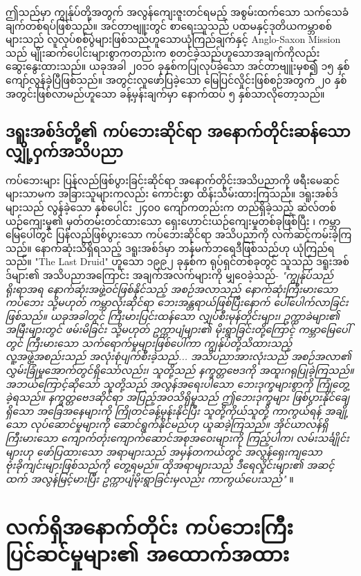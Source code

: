 \documentclass[10pt,twocolumn,letterpaper]{article}
\begin{document}
ဤသည်မှာ ကျွန်ုပ်တို့အတွက် အလွန်ကျေးဇူးတင်ရမည့် အစွမ်းထက်သော သက်သေခံချက်တစ်ရပ်ဖြစ်သည်။ အင်တာဗျူးတွင် စာရေးသူသည် ပထမနှင့်ဒုတိယကမ္ဘာစစ်များသည် လူလုပ်စစ်ပွဲများဖြစ်သည်ဟူသောယုံကြည်ချက်နှင့် Anglo-Saxon Mission သည် မျိုးဆက်ပေါင်းများစွာကတည်းက စတင်ခဲ့သည်ဟူသောအချက်ကိုလည်း ဆွေးနွေးထားသည်။ ယခုအခါ ၂၀၁၀ ခုနှစ်ကပြုလုပ်ခဲ့သော အင်တာဗျူးမှစ၍ ၁၅ နှစ်ကျော်လွန်ခဲ့ပြီဖြစ်သည်။ အတွင်းလူဖော်ပြခဲ့သော မြေပြင်လှိုင်းဖြစ်စဉ်အတွက် ၂၀ နှစ်အတွင်းဖြစ်လာမည်ဟူသော ခန့်မှန်းချက်မှာ နောက်ထပ် ၅ နှစ်သာလိုတော့သည်။
\subsection{ဒရူးအစ်ဒ်တို့၏ ကပ်ဘေးဆိုင်ရာ အနောက်တိုင်းဆန်သော လျှို့ဝှက်အသိပညာ}

ကပ်ဘေးများ ပြန်လည်ဖြစ်ပွားခြင်းဆိုင်ရာ အနောက်တိုင်းအသိပညာကို ဖရီးမေဆင်များသာမက အခြားသူများကလည်း ကောင်းစွာ ထိန်းသိမ်းထားကြသည်။ ဒရူးအစ်ဒ်များသည် လွန်ခဲ့သော နှစ်ပေါင်း ၂၄၀၀ ကျော်ကတည်းက တည်ရှိခဲ့သည့် ဆဲလ်တစ်ယဉ်ကျေးမှု၏ မှတ်တမ်းတင်ထားသော ရှေးဟောင်းယဉ်ကျေးမှုတစ်ခုဖြစ်ပြီး \cite{7}၊ ကမ္ဘာမြေပေါ်တွင် ပြန်လည်ဖြစ်ပွားသော ကပ်ဘေးဆိုင်ရာ အသိပညာကို လက်ဆင့်ကမ်းခဲ့ကြသည်။ နောက်ဆုံးသိရှိရသည့် ဒရူးအစ်ဒ်မှာ ဘန်မက်ဘရေဒီဖြစ်သည်ဟု ယုံကြည်ရသည်။ "The Last Druid" ဟူသော ၁၉၉၂ ခုနှစ်က ရုပ်ရှင်တစ်ခုတွင် သူသည် ဒရူးအစ်ဒ်များ၏ အသိပညာအကြောင်း အချက်အလက်များကို မျှဝေခဲ့သည်- \textit{"ကျွန်ုပ်သည် ရိုးရာအရ နောက်ဆုံးအဖွဲ့ဝင်ဖြစ်နိုင်သည့် အစဉ်အလာသည် နောက်ဆုံးကြီးမားသော ကပ်ဘေး သို့မဟုတ် ကမ္ဘာလုံးဆိုင်ရာ ဘေးအန္တရာယ်ဖြစ်ပြီးနောက် ပေါ်ပေါက်လာခြင်းဖြစ်သည်။ ယခုအခါတွင် ကြီးမားပြင်းထန်သော လျှပ်စီးမုန်တိုင်းများ၊ ဥက္ကာခဲများ၏ အမြီးများတွင် ဖမ်းမိခြင်း သို့မဟုတ် ဥက္ကာပျံများ၏ မိုးရွာခြင်းတို့ကြောင့် ကမ္ဘာမြေပေါ်တွင် ကြီးမားသော သက်ရောက်မှုများဖြစ်ပေါ်ကာ ကျွန်ုပ်တို့သိထားသည့် လူ့အဖွဲ့အစည်းသည် အလုံးစုံပျက်စီးခဲ့သည်... အသိပညာအားလုံးသည် အစဉ်အလာ၏ လွှမ်းခြုံမှုအောက်တွင်ရှိသော်လည်း၊ သူတို့သည် နက္ခတ္တဗေဒကို အထူးဂရုပြုခဲ့ကြသည်။ အဘယ်ကြောင့်ဆိုသော် သူတို့သည် အလွန်အရေးပါသော ဘေးဒုက္ခများစွာကို ကြုံတွေ့ခဲ့ရသည်။ နက္ခတ္တဗေဒဆိုင်ရာ အပြည့်အဝသိရှိမှုသည် ဤဘေးဒုက္ခများ ဖြစ်ပွားနိုင်ချေရှိသော အခြေအနေများကို ကြိုတင်ခန့်မှန်းနိုင်ပြီး သူတို့ကိုယ်သူတို့ ကာကွယ်ရန် အချို့သော လုပ်ဆောင်မှုများကို ဆောင်ရွက်နိုင်မည်ဟု ယူဆခဲ့ကြသည်။ အိုင်ယာလန်ရှိ ကြီးမားသော ကျောက်တုံးကျောက်ဆောင်အစုအဝေးများကို ကြည့်ပါက၊ လမ်းသင်္ချိုင်းများဟု ဖော်ပြထားသော အရာများသည် အမှန်တကယ်တွင် အလွန်ရှေးကျသော ဗုံးခိုကျင်းများဖြစ်သည်ကို တွေ့ရမည်။ ထိုအရာများသည် ဒီရေလှိုင်းများ၏ အဆင့်ထက် အလွန်မြင့်မားပြီး ဥက္ကာပျံမိုးရွာခြင်းမှလည်း ကာကွယ်ပေးသည်"} \cite{8,9}။

\section{လက်ရှိအနောက်တိုင်း ကပ်ဘေးကြီး ပြင်ဆင်မှုများ၏ အထောက်အထား}
\end{document}
